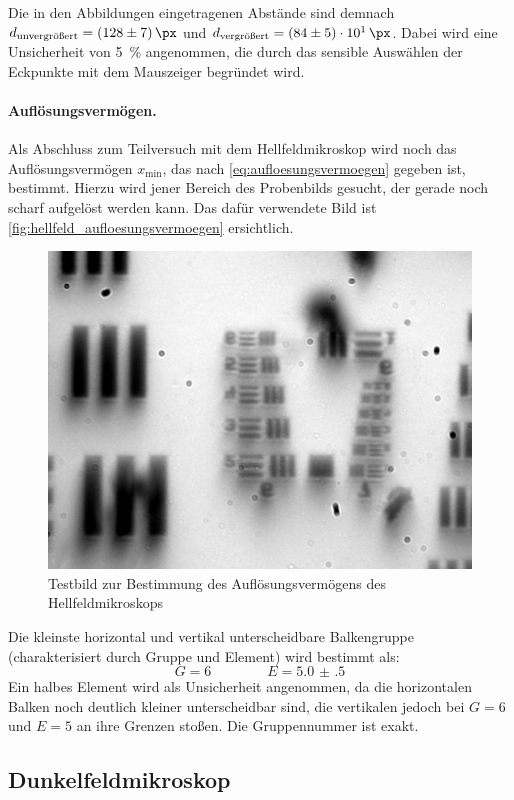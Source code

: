 \documentclass[english, ngerman]{scrartcl}
\begin{document}
\setcaphanging
%
Die in den Abbildungen eingetragenen Abstände sind demnach $d_\text{unvergrößert}=\SI{128(7)}{\px}$ und $d_\text{vergrößert}=\SI{84(5)e1}{\px}$. Dabei wird eine Unsicherheit von \SI{5}{\percent} angenommen, die durch das sensible Auswählen der Eckpunkte mit dem Mauszeiger begründet wird.

\paragraph{Auflösungsvermögen.}
Als Abschluss zum Teilversuch mit dem Hellfeldmikroskop wird noch das Auflösungsvermögen $x_\text{min}$, das nach \autoref{eq:aufloesungsvermoegen} gegeben ist, bestimmt. Hierzu wird jener Bereich des Probenbilds gesucht, der gerade noch scharf aufgelöst werden kann. Das dafür verwendete Bild ist \autoref{fig:hellfeld_aufloesungsvermoegen} ersichtlich.
%
\begin{figure}[H]
    \centering
    \begin{samepage}
        \includegraphics[width=0.475\linewidth]{fig/Versuch3/hellfeld_4.2_aufloesungsvermoegen.jpg}
        \caption[Hellfeld Auflösungsvermögen]{Testbild zur Bestimmung des Auflösungsvermögens des Hellfeldmikroskops}
        \label{fig:hellfeld_aufloesungsvermoegen}
    \end{samepage}
\end{figure}
Die kleinste horizontal und vertikal unterscheidbare Balkengruppe (charakterisiert durch Gruppe und Element) wird bestimmt als:
\[G=6 \qquad\qquad E=\num{5.0(5)}\]
Ein halbes Element wird als Unsicherheit angenommen, da die horizontalen Balken noch deutlich kleiner unterscheidbar sind, die vertikalen jedoch bei $G=6$ und $E=5$ an ihre Grenzen stoßen. Die Gruppennummer ist exakt.


\subsection{Dunkelfeldmikroskop}
\label{subsec:durchfuehrung_dunkelfeld}
\end{document}
